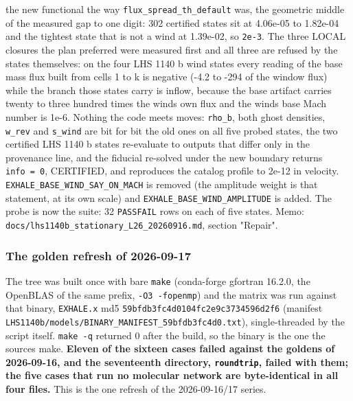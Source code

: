 \documentclass[english,a4paper]{my_memo}
\begin{document}
\begin{itemize}
  the new functional the way \texttt{flux\_spread\_th\_default} was, the geometric middle
  of the measured gap to one digit: 302 certified states sit at 4.06e-05 to
  1.82e-04 and the tightest state that is not a wind at 1.39e-02, so
  \texttt{2e-3}. The three LOCAL closures the plan preferred were measured first and
  all three are refused by the states themselves: on the four LHS 1140 b wind
  states every reading of the base mass flux built from cells 1 to k is
  negative (-4.2 to -294 of the window flux) while the branch those states
  carry is inflow, because the base artifact carries twenty to three hundred
  times the wind\textquotesingle s own flux and the wind\textquotesingle s base Mach number is 1e-6. Nothing
  the code meets moves: \texttt{rho\_b}, both ghost densities, \texttt{w\_rev} and \texttt{s\_wind} are
  bit for bit the old ones on all five probed states, the two certified LHS
  1140 b states re-evaluate to outputs that differ only in the provenance line,
  and the fiducial re-solved under the new boundary returns \texttt{info\ =\ 0},
  CERTIFIED, and reproduces the catalog profile to 2e-12 in velocity.
  \texttt{EXHALE\_BASE\_WIND\_SAY\_ON\_MACH} is removed (the amplitude weight is that
  statement, at its own scale) and \texttt{EXHALE\_BASE\_WIND\_AMPLITUDE} is added. The
  probe is now the suite: 32 \texttt{PASS\textbar{}FAIL} rows on each of five states.
  Memo: \texttt{docs/lhs1140b\_stationary\_L26\_20260916.md}, section "Repair".
\end{itemize}

\subsubsection{The golden refresh of 2026-09-17}\label{the-golden-refresh-of-2026-09-17}

The tree was built once with bare \texttt{make} (conda-forge gfortran 16.2.0, the
OpenBLAS of the same prefix, \texttt{-O3\ -fopenmp}) and the matrix was run against
that binary, \texttt{EXHALE.x} md5 \texttt{59bfdb3fc4d0104fc2e9c3734596d2f6} (manifest
\texttt{LHS1140b/models/BINARY\_MANIFEST\_59bfdb3fc4d0.txt}), single-threaded by the
script itself. \texttt{make\ -q} returned 0 after the build, so the binary is the one
the sources make. \textbf{Eleven of the sixteen cases failed against the goldens of
2026-09-16, and the seventeenth directory, \texttt{roundtrip}, failed with them; the
five cases that run no molecular network are byte-identical in all four
files.} This is the one refresh of the 2026-09-16/17 series.
\end{document}
